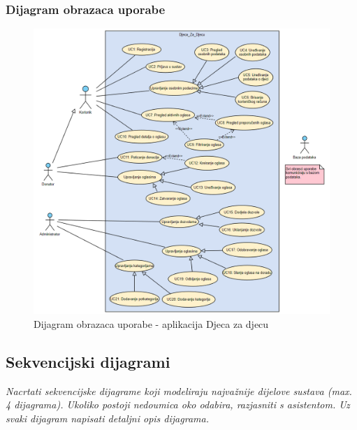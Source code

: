 				\subsubsection{Dijagram obrazaca uporabe}
					\begin{figure}[H]
						\includegraphics[width=\textwidth,height=0.7\textheight]{dijagrami/UCD - Djeca za djecu.png}
						\centering
						\caption{Dijagram obrazaca uporabe - aplikacija Djeca za djecu}
						\label{fig:useCaseDiagramMain}
					\end{figure}
				\eject
				
			\subsection{Sekvencijski dijagrami}
				
				
				\textit{Nacrtati sekvencijske dijagrame koji modeliraju najvažnije dijelove sustava (max. 4 dijagrama). Ukoliko postoji nedoumica oko odabira, razjasniti s asistentom. Uz svaki dijagram napisati detaljni opis dijagrama.}
				\eject
	
